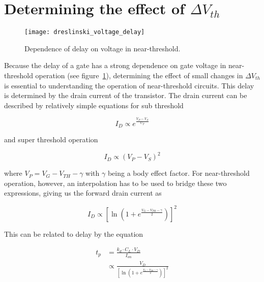 \section{Determining the effect of $\Delta V_{th}$}
\begin{figure}[thpb]
    \centering
    \texttt{[image: dreslinski\_voltage\_delay]}
    \caption{Dependence of delay on voltage in near-threshold.~\cite{Dreslinski:2010ez}}
    \label{fig:voltage_delay}
\end{figure}
Because the delay of a gate has a strong dependence on gate voltage in near-threshold operation (see figure~\ref{fig:voltage_delay}), determining the effect of small changes in $\Delta V_{th}$ is essential to understanding the operation of near-threshold circuits.
This delay is determined by the drain current of the transistor.
The drain current can be described by relatively simple equations for sub threshold \cite{Enz:1995vs} 

\begin{equation}
I_D \propto e^\frac{V_P-V_S}{U_T}
\end{equation}

and super threshold operation

\begin{equation}
I_D \propto (V_P-V_S)^2
\end{equation}

where $V_P=V_G-V_{TH}-\gamma$ with $\gamma$ being a body effect factor. 
For near-threshold operation, however, an interpolation has to be used to bridge these two expressions\cite{Enz:1995vs}, giving us the forward drain current as

\begin{equation}
I_D \propto \left[\ln\left(1+e^\frac{V_G-V_{TH}-\gamma}{2}\right)\right]^2
\end{equation}

This can be related to delay by the equation \cite{Hanson:2007uu}

\begin{align}
t_p &= \frac{k_d\cdot C_L\cdot V_D}{I_{on}}\\
&\propto\frac{V_D}{\left[\ln\left(1+e^\frac{V_G-V_{TH}-\gamma}{2}\right)\right]^2}
\end{align}
 
 